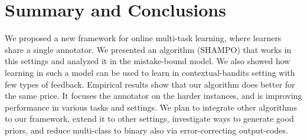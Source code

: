 \chapter{Summary and Conclusions}
We proposed a new framework for online multi-task learning, where  learners share a single annotator. 
We presented an algorithm (SHAMPO) that works in this settings and analyzed it in the mistake-bound 
model. We also showed how learning in such a model can be used to learn in contextual-bandits setting 
with few types of feedback. Empirical results show that our algorithm does better for the same price. 
It focuses the annotator on the harder instances, and is improving performance in various tasks and settings. 
We plan to integrate other algorithms to our framework,  %
extend it to other settings, investigate ways to generate good priors, and reduce multi-class to binary also via error-correcting output-codes.


